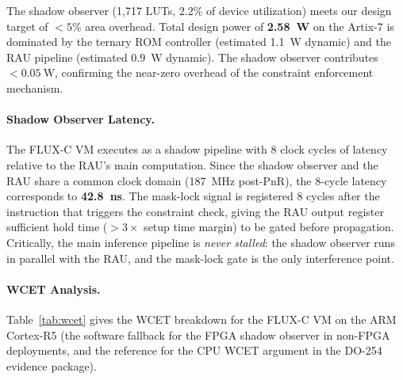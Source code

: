 \documentclass[sigplan,review,anonymous]{acmart}
\begin{document}
The shadow observer (1,717 LUTs, 2.2\% of device utilization) meets our
design target of $< 5\%$ area overhead.
Total design power of \textbf{2.58~W} on the Artix-7 is dominated by the
ternary ROM controller (estimated 1.1~W dynamic) and the RAU pipeline
(estimated 0.9~W dynamic).
The shadow observer contributes $< 0.05~\mathrm{W}$, confirming the
near-zero overhead of the constraint enforcement mechanism.

\paragraph{Shadow Observer Latency.}
The FLUX-C VM executes as a shadow pipeline with 8 clock cycles of latency
relative to the RAU's main computation.
Since the shadow observer and the RAU share a common clock domain
(187~MHz post-PnR), the 8-cycle latency corresponds to \textbf{42.8~ns}.
The mask-lock signal is registered 8 cycles after the instruction that
triggers the constraint check, giving the RAU output register sufficient
hold time ($> 3 \times$ setup time margin) to be gated before propagation.
Critically, the main inference pipeline is \emph{never stalled}: the shadow
observer runs in parallel with the RAU, and the mask-lock gate is the only
interference point.

\paragraph{WCET Analysis.}
Table~\ref{tab:wcet} gives the WCET breakdown for the FLUX-C VM on the
ARM Cortex-R5 (the software fallback for the FPGA shadow observer in
non-FPGA deployments, and the reference for the CPU WCET argument in the
DO-254 evidence package).
\end{document}
